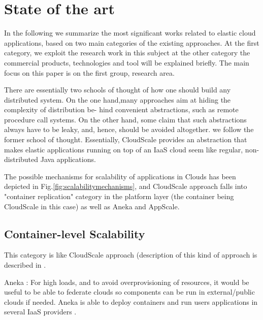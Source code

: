 \documentclass{sig-alternate}
\begin{document}
\section{State of the art}{\label{rw}
In the following we summarize the most significant works related to elastic cloud applications, based on two main categories of the existing approaches.
At the first category, we exploit the research work in this  subject at the other category the commercial products, technologies and tool will be explained briefly. The main focus on this paper is on the first group, research area. 

There are essentially two schools of thought of how one should build any distributed system. On the one hand,many approaches aim at hiding the complexity of distribution be- hind convenient abstractions, such as remote procedure call systems. On the other hand, some claim that such abstractions always have to be leaky, and, hence, should be avoided altogether. we follow the former school of thought. Essentially, CloudScale provides an abstraction that makes elastic applications running on top of an IaaS cloud seem like regular, non-distributed Java applications.

The possible mechanisms for scalability of applications in Clouds has been depicted in Fig.\ref{fig:scalabilitymechanisms}, and CloudScale approach falls into "container replication" category in the platform layer (the container being CloudScale in this case) as well as Aneka and AppScale.

\begin{figure*}
\centering
{}
\caption{Available Mechanisms for Holistic Application Scalability ~\cite{vaquero2011dynamically}}
\label{fig:scalabilitymechanisms}
\end{figure*}

\subsection{Container-level Scalability}
This category is like CloudScale approach (description of this kind of approach is described in \cite{vaquero2011dynamically}.

Aneka \cite{vecchiola2009aneka}: For high loads, and to avoid overprovisioning of resources, it would be useful to be able to federate clouds so components can be run in external/public clouds if needed. Aneka is able to deploy containers and run users applications in several IaaS providers \cite{vaquero2011dynamically}. 

}
\end{document}
